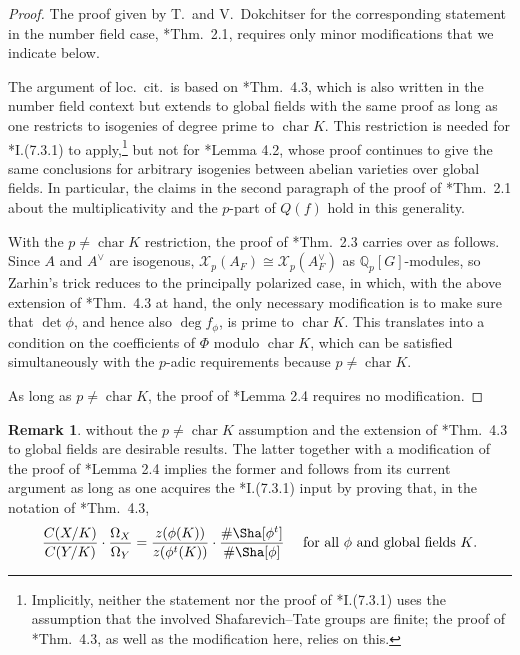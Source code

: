 \documentclass[11pt, reqno]{amsart}
\providecommand{\f}[2]{\frac{#1}{#2}}
\theoremstyle{plain}
\theoremstyle{remark}
\theoremstyle{definition}
\newtheorem{rem}[subsection]{Remark}
\theoremstyle{subsection-tweak}
\numberwithin{equation}{subsection}
\begin{document}
\begin{proof}
The proof given by T.~and V.~Dokchitser for the corresponding statement in the number field case, \cite{DD09c}*{Thm.~2.1}, requires only minor modifications that we indicate below.

The argument of loc.~cit.~is based on \cite{DD10}*{Thm.~4.3}, which is also written in the number field context but extends to global fields with the same proof as long as one restricts to isogenies of degree prime to $\operatorname{char} K$. This restriction is needed for \cite{Mil06}*{I.(7.3.1)} to apply,\footnote{Implicitly, neither the statement nor the proof of \cite{Mil06}*{I.(7.3.1)} uses the assumption that the involved Shafarevich--Tate groups are finite; the proof of \cite{DD10}*{Thm.~4.3}, as well as the modification here, relies on this.} but not for \cite{DD10}*{Lemma 4.2}, whose proof continues to give the same conclusions for arbitrary isogenies between abelian varieties over global fields. In particular, the claims in the second paragraph of the proof of \cite{DD09c}*{Thm.~2.1} about the multiplicativity and the $p$-part of $Q(f)$ hold in this generality.

With the $p \neq \operatorname{char} K$ restriction, the proof of \cite{DD09c}*{Thm.~2.3} carries over as follows. Since $A$ and $A^\vee$ are isogenous, ${\mathcal{X}}_p(A_F) \cong {\mathcal{X}}_p(A^\vee_F)$ as ${\mathbb{Q}}_p[G]$-modules, so Zarhin's trick reduces to the principally polarized case, in which, with the above extension of \cite{DD10}*{Thm.~4.3} at hand, the only necessary modification is to make sure that $\det \phi$, and hence also $\deg f_{\phi}$, is prime to $\operatorname{char} K$. This translates into a condition on the coefficients of $\Phi$ modulo $\operatorname{char} K$, which can be satisfied simultaneously with the $p$-adic requirements because $p \neq \operatorname{char} K$.

As long as $p \neq \operatorname{char} K$, the proof of \cite{DD09c}*{Lemma 2.4} requires no modification.
\end{proof}

\begin{rem}
 without the $p \neq \operatorname{char} K$ assumption and the extension of \cite{DD10}*{Thm.~4.3} to global fields are desirable results. The latter together with a modification of the proof of \cite{DD09c}*{Lemma 2.4} implies the former and follows from its current argument as long as one acquires the \cite{Mil06}*{I.(7.3.1)} input by proving that, in the notation of \cite{DD10}*{Thm.~4.3},
\[
\f{C(X/K)}{C(Y/K)}\cdot \f{\Omega_X}{\Omega_Y} = \f{z(\phi(K))}{z(\phi^t(K))} \cdot \f{\# \Sha[\phi^t]}{\#\Sha[\phi]}\quad\text{ for all $\phi$ and global fields $K$.}
\]
\end{rem}
\end{document}
